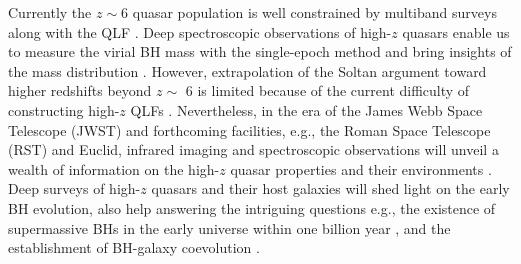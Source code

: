 \documentclass[twocolumn, twocolappendix]{aastex63}
\begin{document}
\begin{CJK*}{UTF8}{gbsn}
Currently the $z\sim 6$ quasar population is well constrained by multiband surveys
\citep{2008AJ....135.1057J,2010AJ....139..906W,2016arXiv161205560C,2016ApJ...833..222J,2018PASJ...70S..35M,2019ApJ...883..183M,2019AJ....157..168D}
along with the QLF \citep[e.g.,][]{2017ApJ...847L..15O,2015ApJ...798...28K,2018ApJ...869..150M}.
Deep spectroscopic observations of high-$z$ quasars enable us to measure the virial BH mass 
with the  single-epoch method and bring insights of the mass distribution
\citep[e.g.,][]{2007AJ....134.1150J,2007ApJ...669...32K,2010AJ....140..546W,2018Natur.553..473B,2019ApJ...880...77O,2019ApJ...873...35S}. 
However, extrapolation of the Soltan argument toward higher redshifts beyond $z\sim$ 6 is limited because of the current difficulty of
constructing high-$z$ QLFs \citep{2013ApJ...768..105M,2016ApJ...829...33Y,2019ApJ...884...30W,2019BAAS...51c.121F}.
Nevertheless, in the era of the James Webb Space Telescope (JWST) and forthcoming facilities,
e.g., the Roman Space Telescope (RST) and Euclid,
infrared imaging and spectroscopic observations will unveil a wealth of information on the
high-$z$ quasar properties and their environments 
\citep{2019BAAS...51c..45R, 2019arXiv190205569A, 2011arXiv1110.3193L}. 
Deep surveys of high-$z$ quasars and their host galaxies will shed light on the early BH evolution, 
also help answering the intriguing questions e.g., 
the existence of supermassive BHs in the early universe within one billion year 
\citep{2012Sci...337..544V,2013ASSL..396..293H,2020ARA&A..58...27I}, 
and the establishment of BH-galaxy coevolution 
\citep[e.g.,][]{2013ApJ...773...44W,2017ApJ...851L...8V,2021ApJ...914...36I,2022ApJ...927..237I,2022MNRAS.511.3751H}.




\end{CJK*}
\end{document}
